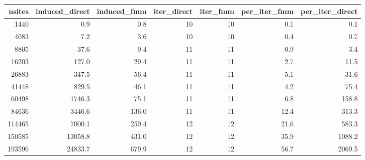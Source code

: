 \begin{tabular}{rrrrrrr}
\toprule
 nsites &  induced\_direct &  induced\_fmm &  iter\_direct &  iter\_fmm &  per\_iter\_fmm &  per\_iter\_direct \\
\midrule
   1440 &             0.9 &          0.8 &           10 &        10 &           0.1 &              0.1 \\
   4083 &             7.2 &          3.6 &           10 &        10 &           0.4 &              0.7 \\
   8805 &            37.6 &          9.4 &           11 &        11 &           0.9 &              3.4 \\
  16203 &           127.0 &         29.4 &           11 &        11 &           2.7 &             11.5 \\
  26883 &           347.5 &         56.4 &           11 &        11 &           5.1 &             31.6 \\
  41448 &           829.5 &         46.1 &           11 &        11 &           4.2 &             75.4 \\
  60498 &          1746.3 &         75.1 &           11 &        11 &           6.8 &            158.8 \\
  84636 &          3446.6 &        136.0 &           11 &        11 &          12.4 &            313.3 \\
 114465 &          7000.1 &        259.4 &           12 &        12 &          21.6 &            583.3 \\
 150585 &         13058.8 &        431.0 &           12 &        12 &          35.9 &           1088.2 \\
 193596 &         24833.7 &        679.9 &           12 &        12 &          56.7 &           2069.5 \\
\bottomrule
\end{tabular}
